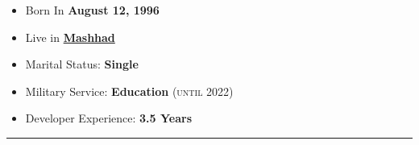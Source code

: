 \documentclass[8pt]{developercv} %
\begin{document}
\begin{minipage}[t]{0.5\textwidth} %
	\vspace{-\baselineskip} %

	\Large {
	\begin{itemize}
		\item {Born In \textbf{August 12, 1996}}
		\item {Live in
		\href{https://www.google.com/maps/place/Mashhad,+Razavi+Khorasan+Province,+Iran/@36.2976014,59.5092469,12z/data=!3m1!4b1!4m5!3m4!1s0x3f6c911abe4131d7:0xc9c57e3a9318753b!8m2!3d36.2619922!4d59.6173096}
		{\textbf{Mashhad}}}
		\item {Marital Status: \textbf{Single} }
		\item {Military Service: \textbf{Education} \normalsize{\textsc{(until 2022)}} }
		\item {Developer Experience: \textbf{3.5 Years}  }
	\end{itemize}
	}

\end{minipage}
\hfill %
\begin{minipage}[t]{0.4\textwidth} %
	\vspace{-\baselineskip} %
	\begin{barchart}{4.5}
	\end{barchart}
\end{minipage}

\begin{center}
\end{center}

\noindent\rule{\textwidth}{1pt}
\vspace{-\baselineskip} %

\end{document}
